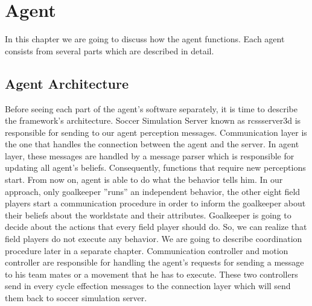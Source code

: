 \chapter{Agent}
\label{Agent}
In this chapter we are going to discuss how the agent functions. Each agent consists from several parts which are described in detail.












\section{Agent Architecture}
Before seeing each part of the agent's software separately, it is time to describe the framework's architecture.  Soccer Simulation Server known as rcssserver3d is responsible for sending to our agent perception messages. Communication layer is the one that handles the connection between the agent and the server. In agent layer, these messages are handled by a message parser which is responsible for updating all agent's beliefs. Consequently, functions that require new perceptions start. From now on, agent is able to do what the behavior tells him.
In our approach, only goalkeeper ''runs'' an independent behavior, the other eight field players start a communication procedure in order to inform the goalkeeper about their beliefs about the worldstate and their attributes. Goalkeeper is going to decide about the actions that every field player should do. So, we can realize that field players do not execute any behavior. We are going to describe coordination procedure later in a separate chapter.
Communication controller and motion controller are responsible for handling the agent's requests for sending a message to his team mates or a movement that he has to execute. These two controllers send in every cycle effection messages to the connection layer which will send them back to soccer simulation server.\\
